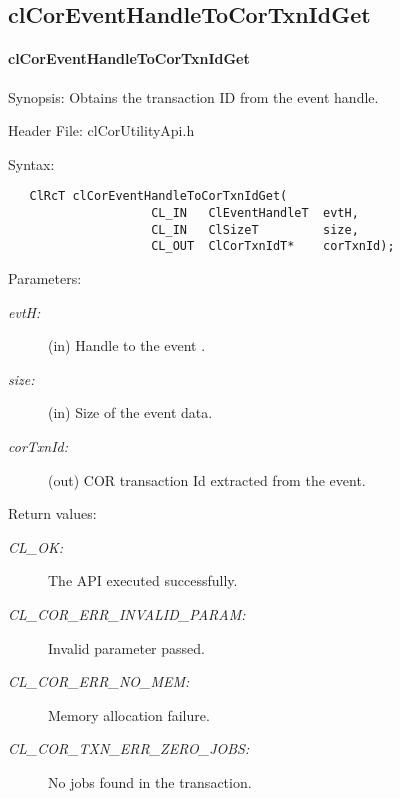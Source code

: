 \begin{flushleft}
\subsection{clCorEventHandleToCorTxnIdGet}
\hypertarget{pagecor200}{}\paragraph{cl\-Cor\-Event\-Handle\-To\-Cor\-Txn\-Id\-Get}\label{pagecor200}
\begin{Desc}
\item[Synopsis:] Obtains the transaction ID from the event handle.
\end{Desc}
\begin{Desc}
\item[Header File:]clCorUtilityApi.h\end{Desc}
\begin{Desc}
\item[Syntax:]

\footnotesize\begin{verbatim}   ClRcT clCorEventHandleToCorTxnIdGet(
					CL_IN 	ClEventHandleT 	evtH, 
					CL_IN 	ClSizeT 		size,  
					CL_OUT	ClCorTxnIdT*	corTxnId);

\end{verbatim}
\normalsize
\end{Desc}
\begin{Desc}
\item[Parameters:]
\begin{description}
\item[{\em evt\-H:}](in) Handle to the event .
\item[{\em size:}](in) Size of the event data.
\item[{\em cor\-Txn\-Id:}](out) COR transaction Id extracted from the event.

\end{description}
\end{Desc}
\begin{Desc}
\item[Return values:]
\begin{description}
\item[{\em CL\_\-OK:}]The API executed successfully. 
\item[{\em CL\_\-COR\_\-ERR\_\-INVALID\_\-PARAM:}] Invalid parameter passed.
\item[{\em CL\_\-COR\_\-ERR\_\-NO\_\-MEM:}] Memory allocation failure.
\item[{\em CL\_\-COR\_\-TXN\_\-ERR\_\-ZERO\_\-JOBS:}] No jobs found in the transaction.


\end{description}
\end{Desc}
\end{flushleft}

